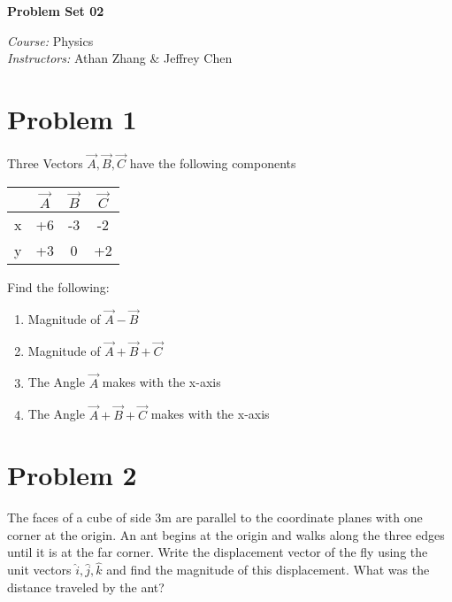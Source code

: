 \documentclass[tikz,border=10pt]{article}
\newcommand{\course}{Physics}
\newcommand{\instructor}{Athan Zhang \& Jeffrey Chen}
\begin{document}
\begin{center}
\textbf{\Huge Problem Set 02} %
\end{center}

\begin{flushleft}
\emph{Course:} \course \\
\emph{Instructors:} \instructor \\
\end{flushleft}

\section*{Problem 1}

Three Vectors $\Vec{A}, \Vec{B}, \Vec{C}$ have the following components

\begin{table}[H]
    \centering
    \begin{tabular}{c|c c c}
          & $\Vec{A}$ & $\Vec{B}$ & $\Vec{C}$ \\
          \hline
        x & +6 & -3 & -2 \\
        y & +3 & 0 & +2 \\
    \end{tabular}
\end{table}

Find the following:

\begin{enumerate}
    \item Magnitude of $\Vec{A} - \Vec{B}$
    \item Magnitude of $\Vec{A} + \Vec{B} + \Vec{C}$
    \item The Angle $\Vec{A}$ makes with the x-axis
    \item The Angle $\Vec{A} + \Vec{B} + \Vec{C}$ makes with the x-axis
\end{enumerate}

\section*{Problem 2}

The faces of a cube of side 3m are parallel to the coordinate planes with one corner at the origin. An ant begins at the origin and walks along the three edges until it is at the far corner. Write the displacement vector of the fly using the unit vectors $\hat{i}, \hat{j}, \hat{k}$ and find the magnitude of this displacement. What was the distance traveled by the ant?
\end{document}
